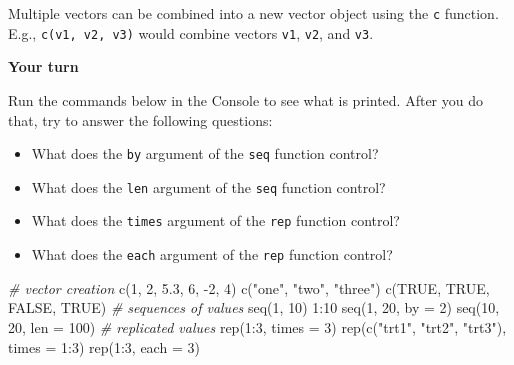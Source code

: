 \documentclass[
]{book}
\newenvironment{Shaded}{\begin{snugshade}}{\end{snugshade}}
\newcommand{\AttributeTok}[1]{\textcolor[rgb]{0.77,0.63,0.00}{#1}}
\newcommand{\CommentTok}[1]{\textcolor[rgb]{0.56,0.35,0.01}{\textit{#1}}}
\newcommand{\ConstantTok}[1]{\textcolor[rgb]{0.00,0.00,0.00}{#1}}
\newcommand{\DecValTok}[1]{\textcolor[rgb]{0.00,0.00,0.81}{#1}}
\newcommand{\FloatTok}[1]{\textcolor[rgb]{0.00,0.00,0.81}{#1}}
\newcommand{\FunctionTok}[1]{\textcolor[rgb]{0.00,0.00,0.00}{#1}}
\newcommand{\NormalTok}[1]{#1}
\newcommand{\SpecialCharTok}[1]{\textcolor[rgb]{0.00,0.00,0.00}{#1}}
\newcommand{\StringTok}[1]{\textcolor[rgb]{0.31,0.60,0.02}{#1}}
\providecommand{\tightlist}{%
  \setlength{\itemsep}{0pt}\setlength{\parskip}{0pt}}
\theoremstyle{definition}
\theoremstyle{definition}
\theoremstyle{definition}
\theoremstyle{definition}
\theoremstyle{remark}
\begin{document}
Multiple vectors can be combined into a new vector object using the \texttt{c} function. E.g., \texttt{c(v1,\ v2,\ v3)} would combine vectors \texttt{v1}, \texttt{v2}, and \texttt{v3}.

\begin{yourturn}

\textbf{Your turn}

Run the commands below in the Console to see what is printed. After you do that, try to answer the following questions:

\begin{itemize}
\tightlist
\item
  What does the \texttt{by} argument of the \texttt{seq} function control?
\item
  What does the \texttt{len} argument of the \texttt{seq} function control?
\item
  What does the \texttt{times} argument of the \texttt{rep} function control?
\item
  What does the \texttt{each} argument of the \texttt{rep} function control?
\end{itemize}

\begin{Shaded}
\begin{Highlighting}[]
\CommentTok{\# vector creation}
\FunctionTok{c}\NormalTok{(}\DecValTok{1}\NormalTok{, }\DecValTok{2}\NormalTok{, }\FloatTok{5.3}\NormalTok{, }\DecValTok{6}\NormalTok{, }\SpecialCharTok{{-}}\DecValTok{2}\NormalTok{, }\DecValTok{4}\NormalTok{)}
\FunctionTok{c}\NormalTok{(}\StringTok{"one"}\NormalTok{, }\StringTok{"two"}\NormalTok{, }\StringTok{"three"}\NormalTok{)}
\FunctionTok{c}\NormalTok{(}\ConstantTok{TRUE}\NormalTok{, }\ConstantTok{TRUE}\NormalTok{, }\ConstantTok{FALSE}\NormalTok{, }\ConstantTok{TRUE}\NormalTok{)}
\CommentTok{\# sequences of values}
\FunctionTok{seq}\NormalTok{(}\DecValTok{1}\NormalTok{, }\DecValTok{10}\NormalTok{)}
\DecValTok{1}\SpecialCharTok{:}\DecValTok{10}
\FunctionTok{seq}\NormalTok{(}\DecValTok{1}\NormalTok{, }\DecValTok{20}\NormalTok{, }\AttributeTok{by =} \DecValTok{2}\NormalTok{)}
\FunctionTok{seq}\NormalTok{(}\DecValTok{10}\NormalTok{, }\DecValTok{20}\NormalTok{, }\AttributeTok{len =} \DecValTok{100}\NormalTok{)}
\CommentTok{\# replicated values}
\FunctionTok{rep}\NormalTok{(}\DecValTok{1}\SpecialCharTok{:}\DecValTok{3}\NormalTok{, }\AttributeTok{times =} \DecValTok{3}\NormalTok{)}
\FunctionTok{rep}\NormalTok{(}\FunctionTok{c}\NormalTok{(}\StringTok{"trt1"}\NormalTok{, }\StringTok{"trt2"}\NormalTok{, }\StringTok{"trt3"}\NormalTok{), }\AttributeTok{times =} \DecValTok{1}\SpecialCharTok{:}\DecValTok{3}\NormalTok{)}
\FunctionTok{rep}\NormalTok{(}\DecValTok{1}\SpecialCharTok{:}\DecValTok{3}\NormalTok{, }\AttributeTok{each =} \DecValTok{3}\NormalTok{)}
\end{Highlighting}
\end{Shaded}


\end{yourturn}
\end{document}
